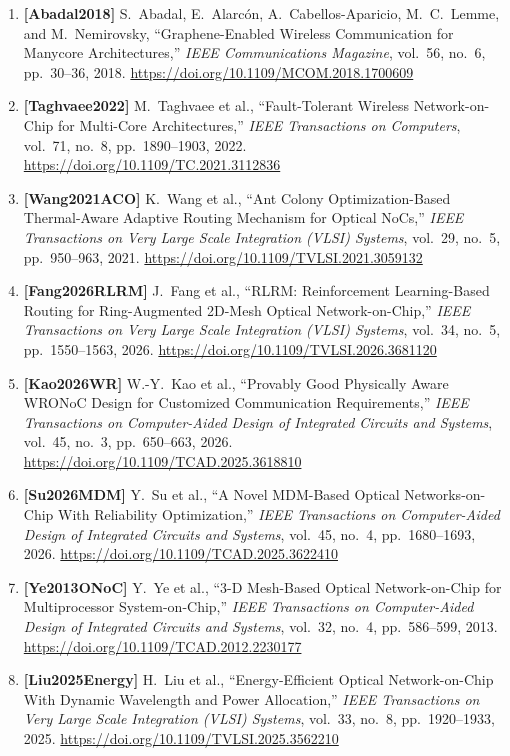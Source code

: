 \begin{enumerate}
    \item \textbf{[Abadal2018]} S.~Abadal, E.~Alarc{\'o}n, A.~Cabellos-Aparicio, M.~C.~Lemme, and M.~Nemirovsky, ``Graphene-Enabled Wireless Communication for Manycore Architectures,'' \emph{IEEE Communications Magazine}, vol.~56, no.~6, pp.~30--36, 2018. \url{https://doi.org/10.1109/MCOM.2018.1700609}
    \item \textbf{[Taghvaee2022]} M.~Taghvaee et al., ``Fault-Tolerant Wireless Network-on-Chip for Multi-Core Architectures,'' \emph{IEEE Transactions on Computers}, vol.~71, no.~8, pp.~1890--1903, 2022. \url{https://doi.org/10.1109/TC.2021.3112836}
    \item \textbf{[Wang2021ACO]} K.~Wang et al., ``Ant Colony Optimization-Based Thermal-Aware Adaptive Routing Mechanism for Optical NoCs,'' \emph{IEEE Transactions on Very Large Scale Integration (VLSI) Systems}, vol.~29, no.~5, pp.~950--963, 2021. \url{https://doi.org/10.1109/TVLSI.2021.3059132}
    \item \textbf{[Fang2026RLRM]} J.~Fang et al., ``RLRM: Reinforcement Learning-Based Routing for Ring-Augmented 2D-Mesh Optical Network-on-Chip,'' \emph{IEEE Transactions on Very Large Scale Integration (VLSI) Systems}, vol.~34, no.~5, pp.~1550--1563, 2026. \url{https://doi.org/10.1109/TVLSI.2026.3681120}
    \item \textbf{[Kao2026WR]} W.-Y.~Kao et al., ``Provably Good Physically Aware WRONoC Design for Customized Communication Requirements,'' \emph{IEEE Transactions on Computer-Aided Design of Integrated Circuits and Systems}, vol.~45, no.~3, pp.~650--663, 2026. \url{https://doi.org/10.1109/TCAD.2025.3618810}
    \item \textbf{[Su2026MDM]} Y.~Su et al., ``A Novel MDM-Based Optical Networks-on-Chip With Reliability Optimization,'' \emph{IEEE Transactions on Computer-Aided Design of Integrated Circuits and Systems}, vol.~45, no.~4, pp.~1680--1693, 2026. \url{https://doi.org/10.1109/TCAD.2025.3622410}
    \item \textbf{[Ye2013ONoC]} Y.~Ye et al., ``3-D Mesh-Based Optical Network-on-Chip for Multiprocessor System-on-Chip,'' \emph{IEEE Transactions on Computer-Aided Design of Integrated Circuits and Systems}, vol.~32, no.~4, pp.~586--599, 2013. \url{https://doi.org/10.1109/TCAD.2012.2230177}
    \item \textbf{[Liu2025Energy]} H.~Liu et al., ``Energy-Efficient Optical Network-on-Chip With Dynamic Wavelength and Power Allocation,'' \emph{IEEE Transactions on Very Large Scale Integration (VLSI) Systems}, vol.~33, no.~8, pp.~1920--1933, 2025. \url{https://doi.org/10.1109/TVLSI.2025.3562210}

\end{enumerate}
